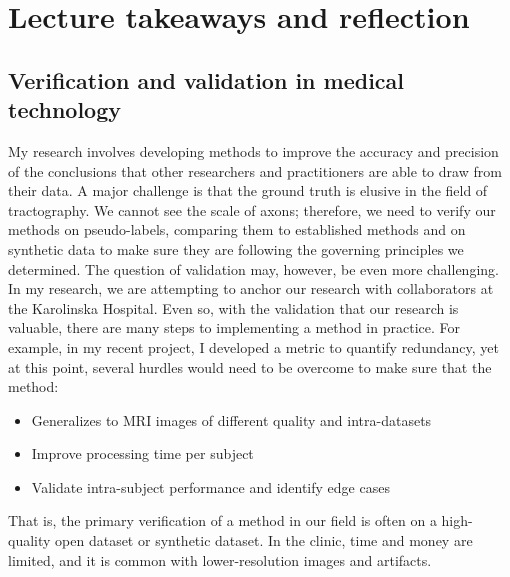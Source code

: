 \documentclass[a4paper, 11pt]{article}
\begin{document}
\section{Lecture takeaways and reflection}

\subsection{Verification and validation in medical technology}
My research involves developing methods to improve the accuracy and precision of the conclusions that other researchers and practitioners are able to draw from their data. A major challenge is that the ground truth is elusive in the field of tractography. We cannot see the scale of axons; therefore, we need to verify our methods on pseudo-labels, comparing them to established methods and on synthetic data to make sure they are following the governing principles we determined. The question of validation may, however, be even more challenging. In my research, we are attempting to anchor our research with collaborators at the Karolinska Hospital. Even so, with the validation that our research is valuable, there are many steps to implementing a method in practice. For example, in my recent project, I developed a metric to quantify redundancy, yet at this point, several hurdles would need to be overcome to make sure that the method:
\begin{itemize}
    \item Generalizes to MRI images of different quality and intra-datasets
    \item Improve processing time per subject
    \item Validate intra-subject performance and identify edge cases
\end{itemize}
That is, the primary verification of a method in our field is often on a high-quality open dataset or synthetic dataset. In the clinic, time and money are limited, and it is common with lower-resolution images and artifacts.
\end{document}

